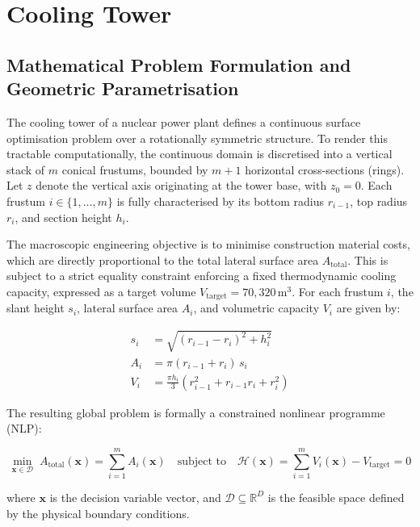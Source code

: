 \section{Cooling Tower}


\subsection{Mathematical Problem Formulation and Geometric Parametrisation}

The cooling tower of a nuclear power plant defines a continuous surface optimisation problem over a rotationally symmetric structure. 
To render this tractable computationally, the continuous domain is discretised into a vertical stack of $m$ conical frustums, bounded by $m+1$ horizontal cross-sections (rings). 
Let $z$ denote the vertical axis originating at the tower base, with $z_0 = 0$. 
Each frustum $i \in \{1, \dots, m\}$ is fully characterised by its bottom radius $r_{i-1}$, top radius $r_i$, and section height $h_i$.


The macroscopic engineering objective is to minimise construction material costs, which are directly proportional to the total lateral surface area $A_{\text{total}}$. 
This is subject to a strict equality constraint enforcing a fixed thermodynamic cooling capacity, expressed as a target volume $V_{\text{target}} = 70{,}320\,\text{m}^3$. 
For each frustum $i$, the slant height $s_i$, lateral surface area $A_i$, and volumetric capacity $V_i$ are given by:

\begin{align}
    s_i &= \sqrt{(r_{i-1} - r_i)^2 + h_i^2} \\
    A_i &= \pi (r_{i-1} + r_i)\, s_i \\
    V_i &= \frac{\pi h_i}{3} \left( r_{i-1}^2 + r_{i-1} r_i + r_i^2 \right)
\end{align}

The resulting global problem is formally a constrained nonlinear programme (NLP):

\begin{equation}
    \min_{\mathbf{x} \in \mathcal{D}}\; A_{\text{total}}(\mathbf{x}) = \sum_{i=1}^{m} A_i(\mathbf{x})
    \quad \text{subject to} \quad
    \mathcal{H}(\mathbf{x}) = \sum_{i=1}^{m} V_i(\mathbf{x}) - V_{\text{target}} = 0
\end{equation}

where $\mathbf{x}$ is the decision variable vector, and $\mathcal{D} \subseteq \mathbb{R}^{D}$ is the feasible space defined by the physical boundary conditions.

